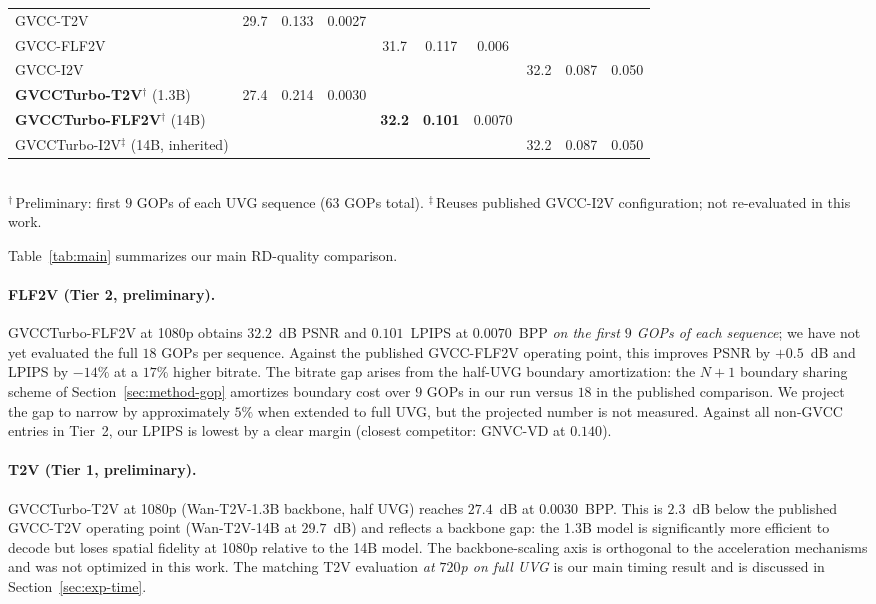 \begin{table}[t]
\begin{tabular}{@{}l ccc ccc ccc@{}}
GVCC-T2V~\cite{zeng2026gvcc}         & 29.7 & 0.133 & 0.0027 & & & & & & \\
GVCC-FLF2V~\cite{zeng2026gvcc}       & & & & 31.7 & 0.117 & 0.006 & & & \\
GVCC-I2V~\cite{zeng2026gvcc}         & & & & & & & 32.2 & 0.087 & 0.050 \\
\rowcolor{wacvblue!10}
\textbf{GVCCTurbo-T2V}$^\dagger$ (1.3B)               & 27.4 & 0.214 & 0.0030 & & & & & & \\
\rowcolor{wacvblue!10}
\textbf{GVCCTurbo-FLF2V}$^\dagger$ (14B)              & & & & \textbf{32.2} & \textbf{0.101} & 0.0070 & & & \\
GVCCTurbo-I2V$^\ddagger$ (14B, inherited)             & & & & & & & 32.2 & 0.087 & 0.050 \\
\bottomrule
\end{tabular}
\\[2pt]
{\footnotesize $^\dagger$\,Preliminary: first $9$ GOPs of each UVG sequence ($63$ GOPs total). \quad $^\ddagger$\,Reuses published GVCC-I2V configuration; not re-evaluated in this work.}
\end{table}

Table~\ref{tab:main} summarizes our main RD-quality comparison.

\paragraph{FLF2V (Tier 2, preliminary).}
GVCCTurbo-FLF2V at 1080p obtains $32.2$~dB PSNR and $0.101$~LPIPS at
$0.0070$~BPP \emph{on the first $9$ GOPs of each sequence}; we have not
yet evaluated the full $18$ GOPs per sequence. Against the published
GVCC-FLF2V operating point, this improves PSNR by $+0.5$~dB and LPIPS
by $-14\%$ at a $17\%$ higher bitrate. The bitrate gap arises from the
half-UVG boundary amortization: the $N\!+\!1$ boundary sharing scheme of
Section~\ref{sec:method-gop} amortizes boundary cost over $9$ GOPs in
our run versus $18$ in the published comparison. We project the gap to
narrow by approximately $5\%$ when extended to full UVG, but the
projected number is not measured. Against all non-GVCC entries in
Tier~2, our LPIPS is lowest by a clear margin (closest competitor:
GNVC-VD at $0.140$).

\paragraph{T2V (Tier 1, preliminary).}
GVCCTurbo-T2V at 1080p (Wan-T2V-1.3B backbone, half UVG) reaches
$27.4$~dB at $0.0030$~BPP. This is $2.3$~dB below the published
GVCC-T2V operating point (Wan-T2V-14B at $29.7$~dB) and reflects a
backbone gap: the 1.3B model is significantly more efficient to decode
but loses spatial fidelity at 1080p relative to the 14B model. The
backbone-scaling axis is orthogonal to the acceleration mechanisms and
was not optimized in this work. The matching T2V evaluation \emph{at
$720$p on full UVG} is our main timing result and is discussed in
Section~\ref{sec:exp-time}.

